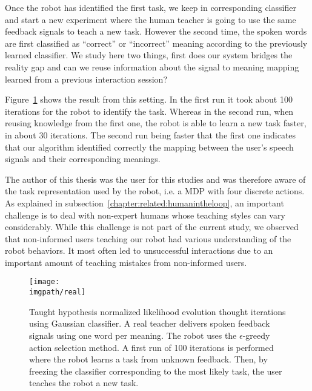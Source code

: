 Once the robot has identified the first task, we keep in corresponding classifier and start a new experiment where the human teacher is going to use the same feedback signals to teach a new task. However the second time, the spoken words are first classified as ``correct'' or ``incorrect'' meaning according to the previously learned classifier. We study here two things, first does our system bridges the reality gap and can we reuse information about the signal to meaning mapping learned from a previous interaction session?

Figure~\ref{fig:Real} shows the result from this setting. In the first run it took about 100 iterations for the robot to identify the task. Whereas in the second run, when reusing knowledge from the first one, the robot is able to learn a new task faster, in about 30 iterations. The second run being faster that the first one indicates that our algorithm identified correctly the mapping between the user's speech signals and their corresponding meanings. 

The author of this thesis was the user for this studies and was therefore aware of the task representation used by the robot, i.e. a MDP with four discrete actions. As explained in subsection~\ref{chapter:related:humanintheloop}, an important challenge is to deal with non-expert humans whose teaching styles can vary considerably. While this challenge is not part of the current study, we observed that non-informed users teaching our robot had various understanding of the robot behaviors. It most often led to unsuccessful interactions due to an important amount of teaching mistakes from non-informed users.


\begin{figure}[!htbp]
  \centering
  \texttt{[image: \\imgpath/real]}
  \caption{Taught hypothesis normalized likelihood evolution thought iterations using Gaussian classifier. A real teacher delivers spoken feedback signals using one word per meaning. The robot uses the $\epsilon$-greedy action selection method. A first run of 100 iterations is performed where the robot learns a task from unknown feedback. Then, by freezing the classifier corresponding to the most likely task, the user teaches the robot a new task.}
  \label{fig:Real}
\end{figure}


